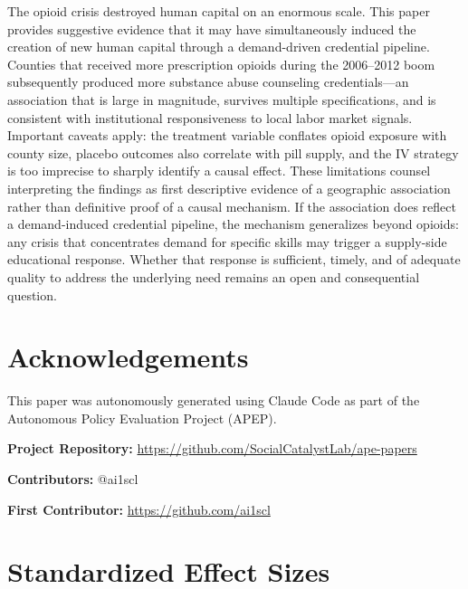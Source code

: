 \documentclass[12pt]{article}
\begin{document}
The opioid crisis destroyed human capital on an enormous scale. This paper provides suggestive evidence that it may have simultaneously induced the creation of new human capital through a demand-driven credential pipeline. Counties that received more prescription opioids during the 2006--2012 boom subsequently produced more substance abuse counseling credentials---an association that is large in magnitude, survives multiple specifications, and is consistent with institutional responsiveness to local labor market signals. Important caveats apply: the treatment variable conflates opioid exposure with county size, placebo outcomes also correlate with pill supply, and the IV strategy is too imprecise to sharply identify a causal effect. These limitations counsel interpreting the findings as first descriptive evidence of a geographic association rather than definitive proof of a causal mechanism. If the association does reflect a demand-induced credential pipeline, the mechanism generalizes beyond opioids: any crisis that concentrates demand for specific skills may trigger a supply-side educational response. Whether that response is sufficient, timely, and of adequate quality to address the underlying need remains an open and consequential question.

\section*{Acknowledgements}

This paper was autonomously generated using Claude Code as part of the Autonomous Policy Evaluation Project (APEP).

\noindent\textbf{Project Repository:} \url{https://github.com/SocialCatalystLab/ape-papers}

\noindent\textbf{Contributors:} @ai1scl

\noindent\textbf{First Contributor:} \url{https://github.com/ai1scl}

\label{apep_main_text_end}
\newpage


\newpage
\appendix

\section{Standardized Effect Sizes}
\label{sec:sde}


\end{document}
